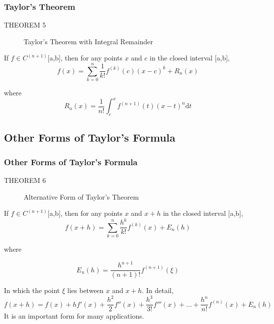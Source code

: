 \documentclass[notheorems,mathserif,table,compress]{beamer}  %
\begin{document}
\begin{frame}
\frametitle{Taylor's Theorem}
\begin{description}
\item[THEOREM 5] \textsf{Taylor's Theorem with Integral Remainder}
\end{description}
If $f \in C^{(n+1)}$[a,b], then for any points $x$ and $c$ in the closed interval [a,b],
\begin{displaymath}
f(x)=\sum_{k=0}^n\frac{1}{k!}f^{(k)}(c)(x-c)^k+R_n(x)
\end{displaymath}

where 
\newcommand{\ud}{\mathrm{d}}
\begin{displaymath}
R_n(x)=\frac{1}{n!}\int_{c}^{x}f^{(n+1)}(t)(x-t)^n \ud t
\end{displaymath}

\end{frame}

\subsection{Other Forms of Taylor's Formula}

\begin{frame}
\frametitle{Other Forms of Taylor's Formula}
\begin{description}
\item[THEOREM 6] \textsf{Alternative Form of Taylor's Theorem}
\end{description}
If $f \in C^{(n+1)}$[a,b], then for any points $x$ and $x+h$ in the closed interval [a,b],
\begin{displaymath}
f(x+h)=\sum_{k=0}^n\frac{h^k}{k!}f^{(k)}(x)+E_n(h)
\end{displaymath}

where 

\begin{displaymath}
E_n(h)=\frac{h^{n+1}}{(n+1)!} f^{(n+1)}(\xi)
\end{displaymath}

In which the point $\xi$ lies between $x$ and $x+h$. In detail,
\begin{displaymath}
f(x+h)=f(x)+hf'(x)+\frac{h^2}{2}f''(x)+\frac{h^3}{3!}f'''(x)+\ldots+\frac{h^n}{n!}f^{(n)}(x)+E_n(h)
\end{displaymath}
It is an important form for many applications.
\end{frame}
\end{document}
